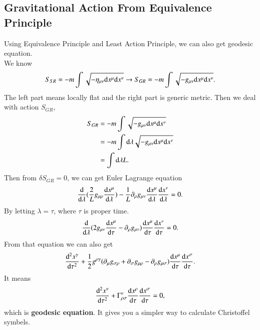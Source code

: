 \documentclass[openany,10pt]{book}
\theoremstyle{definition}
\theoremstyle{definition}
\theoremstyle{remark}
\begin{document}
\subsection{Gravitational Action From Equivalence Principle}
Using Equivalence Principle and Least Action Principle, we can also get geodesic equation.\\
We know
\begin{equation}
    S_{SR}=-m\int{\sqrt{-\eta_{\mu\nu}{\rm{d}}x^\mu{\rm{d}}x^\nu}}\to S_{GR}=-m\int\sqrt{-g_{\mu\nu}{\rm{d}}x^\mu{\rm{d}}x^\nu}.
\end{equation}
The left part means locally flat and the right part is generic metric. Then we deal with action $S_{GR}$, 
\begin{equation}
    \begin{aligned}
        S_{GR}&=-m\int\sqrt{-g_{\mu\nu}{\rm{d}}x^\mu{\rm{d}}x^\nu}\\
        &=-m\int{\rm{d}}\lambda\sqrt{-g_{\mu\nu}{\rm{d}}x^\mu{\rm{d}}x^\nu}\\
        &=\int{\rm{d}}\lambda L.
    \end{aligned}
\end{equation}
Then from $\delta S_{GR}=0$, we can get Euler Lagrange equation 
\begin{equation}
    \frac{{\rm{d}}}{{\rm{d}}\lambda}(\frac{2}{L}g_{\mu\rho}\frac{{\rm{d}}x^\mu}{{\rm{d}}\lambda})-\frac{1}{L}\partial_\rho g_{\mu\nu}\frac{{\rm{d}}x^\mu}{{\rm{d}}\lambda}\frac{{\rm{d}}x^\nu}{{\rm{d}}\lambda}=0.
\end{equation}
By letting $\lambda=\tau$, where $\tau$ is proper time. 
\begin{equation}
    \frac{{\rm{d}}}{{\rm{d}}\lambda}(2g_{\mu\nu}\frac{{\rm{d}}x^\mu}{{\rm{d}}\tau}-\partial_\rho g_{\mu\nu})\frac{{\rm{d}}x^\mu}{{\rm{d}}\tau}\frac{{\rm{d}}x^\nu}{{\rm{d}}\tau}=0.
\end{equation}
From that equation we can also get 
\begin{equation}
    \frac{{\rm{d}}^2x^\gamma}{{\rm{d}}\tau^2}+\frac{1}{2}g^{\rho\gamma}(\partial_\mu g_{\sigma\rho}+\partial_\sigma g_{\mu\rho}-\partial_\rho g_{\mu\sigma})\frac{{\rm{d}}x^\mu}{{\rm{d}}\tau}\frac{{\rm{d}}x^\sigma}{{\rm{d}}\tau}.
\end{equation}
It means 
\begin{equation}
    \frac{{\rm d}^2x^\nu}{{\rm d}\tau^2}+\Gamma^\nu_{\rho\sigma}\frac{{\rm d}x^\rho}{{\rm d}\tau}\frac{{\rm d}x^\sigma}{{\rm d}\tau}=0,
\end{equation}
which is \textbf{geodesic equation}. It gives you a simpler way to calculate Christoffel symbels. 
\end{document}
